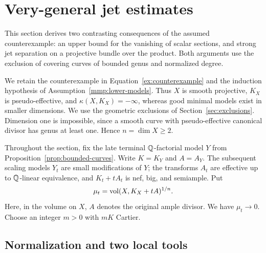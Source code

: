 \section{Very-general jet estimates}\label{sec:jets}

This section derives two contrasting consequences of the assumed
counterexample: an upper bound for the vanishing of scalar sections,
and strong jet separation on a projective bundle over the product.
Both arguments use the exclusion of covering curves of bounded genus
and normalized degree.

We retain the counterexample in Equation~\eqref{ex:counterexample}
and the induction hypothesis of Assumption~\ref{mmp:lower-models}.
Thus \(X\) is smooth projective,
\(K_X\) is pseudo-effective, and \(\kappa(X,K_X)=-\infty\), whereas
good minimal models exist in smaller dimensions. We use the geometric
exclusions of Section~\ref{sec:exclusions}. Dimension one is impossible, since a
smooth curve with pseudo-effective canonical divisor has genus at least
one.  Hence \(n=\dim X\ge2\).

Throughout the section, fix the late terminal \(\mathbb{Q}\)-factorial model
\(Y\) from
Proposition~\ref{prop:bounded-curves}.  Write \(K=K_Y\) and \(A=A_Y\).
The subsequent scaling models \(Y_t\) are small modifications of \(Y\);
the transforms \(A_t\) are effective up to \(\mathbb{Q}\)-linear equivalence,
and \(K_t+tA_t\) is nef, big, and semiample.  Put
\[
 \mu_t=\operatorname{vol}(X,K_X+tA)^{1/n}.
\]
Here, in the volume on \(X\), \(A\) denotes the original ample divisor.
We have \(\mu_t\to0\).  Choose an integer \(m>0\) with \(mK\) Cartier.

\subsection{Normalization and two local tools}

